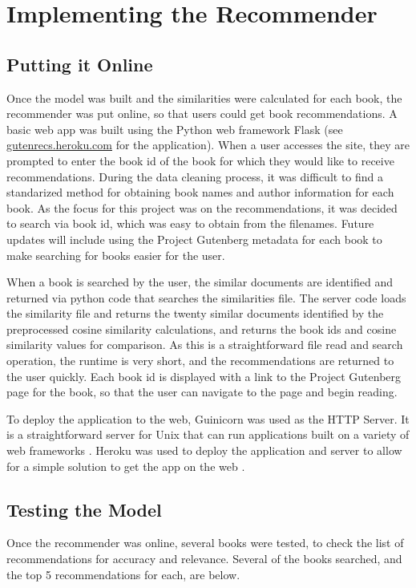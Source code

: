 \documentclass[10pt]{report}
\begin{document}
\section*{Implementing the Recommender}
\subsection*{Putting it Online}
Once the model was built and the similarities were calculated for each book, the recommender was put online, so that users could get book recommendations. A basic web app was built using the Python web framework Flask\cite{flask} (see \url{gutenrecs.heroku.com} for the application). When a user accesses the site, they are prompted to enter the book id of the book for which they would like to receive recommendations. During the data cleaning process, it was difficult to find a standarized method for obtaining book names and author information for each book. As the focus for this project was on the recommendations, it was decided to search via book id, which was easy to obtain from the filenames. Future updates will include using the Project Gutenberg metadata for each book to make searching for books easier for the user.

When a book is searched by the user, the similar documents are identified and returned via python code that searches the similarities file. The server code loads the similarity file and returns the twenty similar documents identified by the preprocessed cosine similarity calculations, and returns the book ids and cosine similarity values for comparison. As this is a straightforward file read and search operation, the runtime is very short, and the recommendations are returned to the user quickly. Each book id is displayed with a link to the Project Gutenberg page for the book, so that the user can navigate to the page and begin reading.

To deploy the application to the web, Guinicorn was used as the HTTP Server. It is a straightforward server for Unix that can run applications built on a variety of web frameworks \cite{gunicorn}. Heroku was used to deploy the application and server to allow for a simple solution to get the app on the web \cite{heroku}. 

\subsection*{Testing the Model}
Once the recommender was online, several books were tested, to check the list of recommendations for accuracy and relevance. Several of the books searched, and the top 5 recommendations for each, are below.
\end{document}
